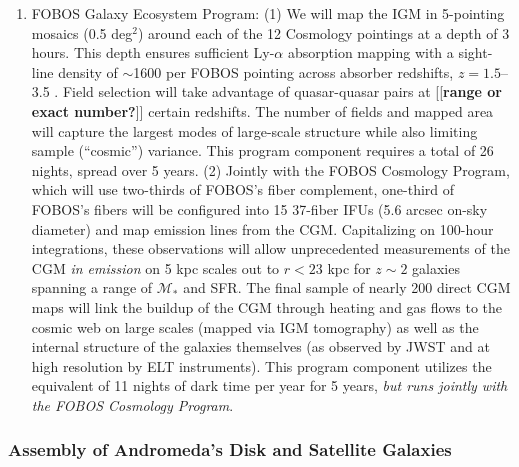 \documentclass[oneside,11pt]{amsart}
\newcommand{\comment}[2][todo]{{\color{#1}[[{\bf #2}]]}}
\newcounter{chalno}
\newcommand{\chal}[1]{\refstepcounter{chalno}\label{#1}}
\begin{document}

\chal{phot}
%
\begin{enumerate}[rightmargin=0.2cm,leftmargin=0.2cm]
%
\item[] {\textsf {\large FOBOS Galaxy Ecosystem Program:}} (1) We
will map the IGM in 5-pointing mosaics (0.5 deg$^2$) around each of
the 12 Cosmology pointings at a depth of 3 hours. This depth ensures
sufficient Ly-$\alpha$ absorption mapping with a sight-line density
of $\sim$1600 per FOBOS pointing across absorber redshifts, $z =
1.5$--3.5 \citep[see][]{lee16}. Field selection will take advantage
of quasar-quasar pairs at \comment{range or exact number?} certain
redshifts. The number of fields and mapped area will capture the
largest modes of large-scale structure while also limiting sample
(``cosmic'') variance. This program component requires a total of 26
nights, spread over 5 years. (2) Jointly with the FOBOS Cosmology
Program, which will use two-thirds of FOBOS's fiber complement,
one-third of FOBOS's fibers will be configured into 15 37-fiber IFUs
(5.6 arcsec on-sky diameter) and map emission lines from the CGM.
Capitalizing on 100-hour integrations, these observations will allow
unprecedented measurements of the CGM {\it in emission} on 5 kpc
scales out to $r < 23$ kpc for $z \sim 2$ galaxies spanning a range
of $\mathcal{M}_*$ and SFR. The final sample of nearly 200 direct CGM
maps will link the buildup of the CGM through heating and gas flows
to the cosmic web on large scales (mapped via IGM tomography) as well
as the internal structure of the galaxies themselves (as observed by
JWST and at high resolution by ELT instruments). This program component
utilizes the equivalent of 11 nights of dark time per year for 5
years, {\it but runs jointly with the FOBOS Cosmology Program}.
%
\end{enumerate}

\subsubsection{Assembly of Andromeda's Disk and Satellite Galaxies}
\label{sec:localgroup}
\end{document}
